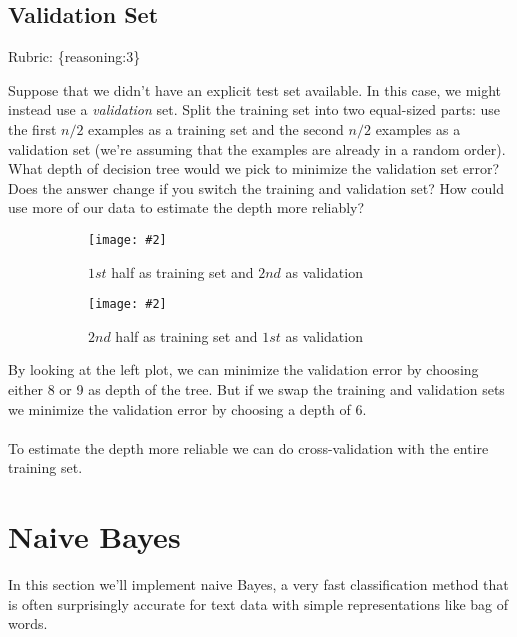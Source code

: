 \documentclass{article}
\def\rubric#1{\gre{Rubric: \{#1\}}}{}
\def\blu#1{{\color{blu}#1}}
\def\gre#1{{\color{gre}#1}}
\def\ans#1{{\color{ans}#1}}
\newcommand{\centerfig}[2]{\begin{center}\texttt{[image: \#2]}\end{center}}
\begin{document}
\subsection{Validation Set}
\rubric{reasoning:3}

Suppose that we didn't have an explicit test set available. In this case, we might instead use a \emph{validation} set. Split the training set into two equal-sized parts: use the first $n/2$ examples as a training set and the second $n/2$ examples as a validation set (we're assuming that the examples are already in a random order). \blu{What depth of decision tree would we pick to minimize the validation set error? Does the answer change if you switch the training and validation set? How could use more of our data to  estimate the depth more reliably?} \\
\clearpage
\begin{figure}[htp]
   \begin{subfigure}[b]{0.5\textwidth} \color{ans}
       \centerfig{1}{../figs/q1_2_training_validation_1}
       {
         \begin{center}
            $1st$ half as training set and $2nd$ as validation
         \end{center}
       }
     \label{fig:1}
   \end{subfigure}
   \begin{subfigure}[b]{0.5\textwidth} \color{ans}
       \centerfig{1}{../figs/q1_2_training_validation_2}
      {
          \begin{center}
            $2nd$ half as training set and $1st$ as validation
          \end{center}
      }
     \label{fig:2}
   \end{subfigure}
\end{figure}
\ans{
   By looking at the left plot, we can minimize the validation error by choosing either 8 or 9 as 
   depth of the tree. But if we swap the training and validation sets we minimize the validation error 
   by choosing a depth of 6. \\ \\
   To estimate the depth more reliable we can do cross-validation with the entire training set.
}

\section{Naive Bayes}

In this section we'll implement naive Bayes, a very fast classification method that is often surprisingly accurate for text data with simple representations like bag of words.
\end{document}

